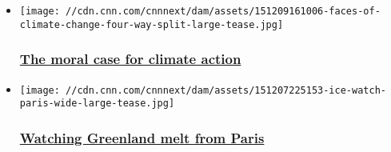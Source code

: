 \begin{itemize}
\item
  \href{/2015/12/09/opinions/sutter-faces-climate-change-cop21/index.html}{}

  \texttt{[image: //cdn.cnn.com/cnnnext/dam/assets/151209161006-faces-of-climate-change-four-way-split-large-tease.jpg]}

  \hypertarget{the-moral-case-for-climate-action}{%
  \subsubsection{\texorpdfstring{\href{/2015/12/09/opinions/sutter-faces-climate-change-cop21/index.html}{The
  moral case for climate
  action}}{The moral case for climate action}}\label{the-moral-case-for-climate-action}}
\item
  \href{/2015/12/08/opinions/sutter-ice-watch-cop21-two-degrees/index.html}{}

  \texttt{[image: //cdn.cnn.com/cnnnext/dam/assets/151207225153-ice-watch-paris-wide-large-tease.jpg]}

  \hypertarget{watching-greenland-melt-from-paris}{%
  \subsubsection{\texorpdfstring{\href{/2015/12/08/opinions/sutter-ice-watch-cop21-two-degrees/index.html}{Watching
  Greenland melt from
  Paris}}{Watching Greenland melt from Paris}}\label{watching-greenland-melt-from-paris}}
\end{itemize}


